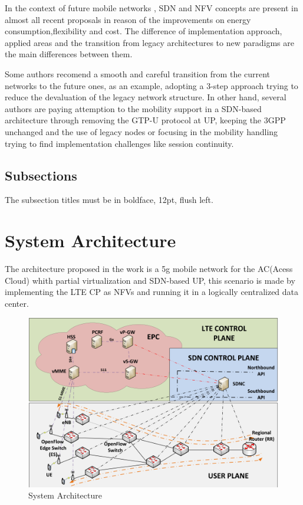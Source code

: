 \documentclass[12pt]{article}
\begin{document}
In the context of future mobile networks , SDN and NFV concepts are present in almost all recent proposals in reason of the improvements on energy consumption,flexibility and cost. The difference of implementation approach, applied areas and the transition from legacy architectures to new paradigms are the main differences between them.

Some authors recomend a smooth and careful transition from the current networks to the future ones, as an example, adopting a 3-step approach trying to reduce the devaluation of the legacy network structure. In other hand, several authors are paying attemption to the mobility support in a SDN-based architecture through removing the  GTP-U protocol at UP, keeping the 3GPP unchanged and the use of legacy nodes or focusing in the mobility handling trying to find implementation challenges like session continuity. 

\subsection{Subsections}

The subsection titles must be in boldface, 12pt, flush left.

\section{System Architecture}

The architecture proposed in the work is a 5g mobile network for the AC(Acess Cloud) whith partial virtualization and SDN-based UP, this scenario is made by implementing the LTE CP as NFVs and running it in a logically centralized data center.

\begin{figure}[ht]
\centering
\includegraphics[width=.7\textwidth]{figurejamelly.png}
\caption{System Architecture}
\label{figure 4: System Architecture}
\end{figure}
\end{document}
